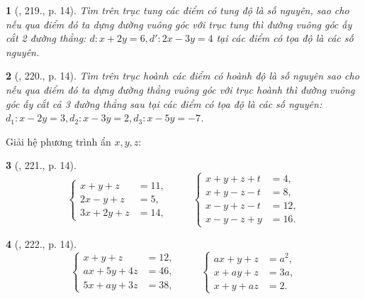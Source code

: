 \documentclass{article}
\newtheorem{baitoan}{}
\begin{document}
\begin{baitoan}[\cite{Binh_Toan_9_tap_2}, 219., p. 14]
	Tìm trên trục tung các điểm có tung độ là số nguyên, sao cho nếu qua điểm đó ta dựng đường vuông góc với trục tung thì đường vuông góc ấy cắt 2 đường thẳng: $d:x + 2y = 6,d':2x - 3y = 4$ tại các điểm có tọa độ là các số nguyên.
\end{baitoan}

\begin{baitoan}[\cite{Binh_Toan_9_tap_2}, 220., p. 14]
	Tìm trên trục hoành các điểm có hoành độ là số nguyên sao cho nếu qua điểm đó ta dựng đường thẳng vuông góc với trục hoành thì đường vuông góc ấy cắt cả 3 đường thẳng sau tại các điểm có tọa độ là các số nguyên: $d_1:x - 2y = 3,d_2:x - 3y = 2,d_3:x - 5y = -7$.
\end{baitoan}
Giải hệ phương trình ẩn $x,y,z$:

\begin{baitoan}[\cite{Binh_Toan_9_tap_2}, 221., p. 14]
	\begin{equation*}
		\left\{\begin{split}
			x + y + z &= 11,\\
			2x - y + z &= 5,\\
			3x + 2y + z &= 14,
		\end{split}\right.\hspace{1cm}\left\{\begin{split}
			x + y + z + t &= 4,\\
			x + y - z - t &= 8,\\
			x - y + z - t &= 12,\\
			x - y - z + y &= 16.
		\end{split}\right.
	\end{equation*}
\end{baitoan}

\begin{baitoan}[\cite{Binh_Toan_9_tap_2}, 222., p. 14]
	\begin{equation*}
		\left\{\begin{split}
			x + y + z &= 12,\\
			ax + 5y + 4z &= 46,\\
			5x + ay + 3z &= 38,
		\end{split}\right.\hspace{1cm}\left\{\begin{split}
			ax + y + z &= a^2,\\
			x + ay + z &= 3a,\\
			x + y + az &= 2.
		\end{split}\right.
	\end{equation*}
\end{baitoan}
\end{document}
